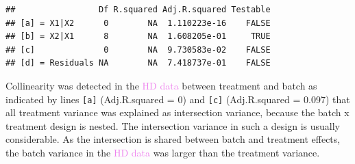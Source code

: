 \documentclass[
]{book}
\newenvironment{Shaded}{\begin{snugshade}}{\end{snugshade}}
\newcommand{\AttributeTok}[1]{\textcolor[rgb]{0.77,0.63,0.00}{#1}}
\newcommand{\CommentTok}[1]{\textcolor[rgb]{0.56,0.35,0.01}{\textit{#1}}}
\newcommand{\ConstantTok}[1]{\textcolor[rgb]{0.00,0.00,0.00}{#1}}
\newcommand{\FunctionTok}[1]{\textcolor[rgb]{0.00,0.00,0.00}{#1}}
\newcommand{\NormalTok}[1]{#1}
\newcommand{\OtherTok}[1]{\textcolor[rgb]{0.56,0.35,0.01}{#1}}
\newcommand{\SpecialCharTok}[1]{\textcolor[rgb]{0.00,0.00,0.00}{#1}}
\newcommand{\StringTok}[1]{\textcolor[rgb]{0.31,0.60,0.02}{#1}}
\begin{document}
\begin{Shaded}
\end{Shaded}

\begin{verbatim}
##                 Df R.squared Adj.R.squared Testable
## [a] = X1|X2      0        NA  1.110223e-16    FALSE
## [b] = X2|X1      8        NA  1.608205e-01     TRUE
## [c]              0        NA  9.730583e-02    FALSE
## [d] = Residuals NA        NA  7.418737e-01    FALSE
\end{verbatim}

Collinearity was detected in the \textcolor{violet}{HD data} between treatment and batch as indicated by lines \texttt{{[}a{]}} (Adj.R.squared = 0) and \texttt{{[}c{]}} (Adj.R.squared = 0.097) that all treatment variance was explained as intersection variance, because the batch x treatment design is nested. The intersection variance in such a design is usually considerable. As the intersection is shared between batch and treatment effects, the batch variance in the \textcolor{violet}{HD data} was larger than the treatment variance.
\end{document}
